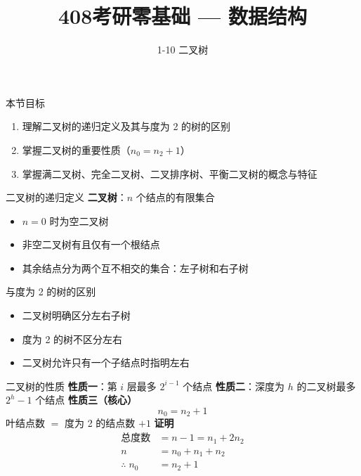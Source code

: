 \documentclass[10pt, aspectratio=169]{beamer}
\title{408考研零基础 --- 数据结构}
\subtitle{1-10 二叉树}
\author{}
\date{}
\begin{document}
\begin{frame}{本节目标}
    \begin{enumerate}
        \item 理解二叉树的递归定义及其与度为 2 的树的区别
        \item 掌握二叉树的重要性质（$n_0 = n_2 + 1$）
        \item 掌握满二叉树、完全二叉树、二叉排序树、平衡二叉树的概念与特征
    \end{enumerate}
\end{frame}

\begin{frame}{二叉树的递归定义}
    \textbf{二叉树}：$n$ 个结点的有限集合
    \begin{itemize}
        \item $n = 0$ 时为空二叉树
        \item 非空二叉树有且仅有一个根结点
        \item 其余结点分为两个互不相交的集合：左子树和右子树
    \end{itemize}
    \vspace{0.5em}
    \begin{alertblock}{与度为 2 的树的区别}
        \begin{itemize}
            \item 二叉树明确区分左右子树
            \item 度为 2 的树不区分左右
            \item 二叉树允许只有一个子结点时指明左右
        \end{itemize}
    \end{alertblock}
\end{frame}

\begin{frame}{二叉树的性质}
    \textbf{性质一}：第 $i$ 层最多 $2^{i-1}$ 个结点
    \vspace{0.3em}
    \textbf{性质二}：深度为 $h$ 的二叉树最多 $2^h - 1$ 个结点
    \vspace{0.3em}
    \textbf{性质三（核心）}
    \[
    n_0 = n_2 + 1
    \]
    叶结点数 $=$ 度为 2 的结点数 $+ 1$
    \vspace{0.3em}
    \textbf{证明}
    \[
    \begin{aligned}
    \text{总度数} &= n - 1 = n_1 + 2n_2\\
    n &= n_0 + n_1 + n_2\\
    \therefore\; n_0 &= n_2 + 1
    \end{aligned}
    \]
\end{frame}
\end{document}
